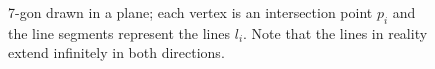 

\begin{figure}
    \centering
    
    \caption{7-gon drawn in a plane; each vertex is an intersection point $p_i$ and the line segments represent the lines $l_i$. Note that the lines in reality extend infinitely in both directions.}
    \label{fig:m-gon}
\end{figure}

